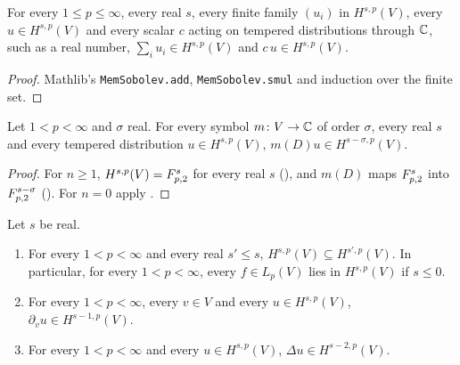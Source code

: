 \begin{lemma}
\label{lem:bessel-potential-closure}
\leanok
For every $1 \leq p \leq \infty$, every real $s$, every finite family $(u_i)$ in $H^{s,p}(V)$,
every $u \in H^{s,p}(V)$ and every scalar $c$ acting on tempered distributions through $\mathbb{C}$, such
as a real number, $\sum_i u_i \in H^{s,p}(V)$ and $c \, u \in H^{s,p}(V)$.
\end{lemma}

\begin{proof}
\leanok
Mathlib's \texttt{MemSobolev.\allowbreak add}, \texttt{MemSobolev.\allowbreak smul} and induction
over the finite set.
\end{proof}

\begin{theorem}
\label{thm:bessel-potential-multiplier}
\leanok
{}
Let $1 < p < \infty$ and $\sigma$ real. For every symbol $m \colon V \to \mathbb{C}$ of order $\sigma$,
every real $s$ and every tempered distribution $u \in H^{s,p}(V)$,
$m(D) u \in H^{s-\sigma,p}(V)$.
\end{theorem}

\begin{proof}
\leanok
For $n \geq 1$, $H^{s,p}(V) = F^{s}_{p,2}$ for every real $s$
(), and $m(D)$ maps $F^{s}_{p,2}$ into
$F^{s-\sigma}_{p,2}$ (). For $n = 0$ apply
.
\end{proof}

\begin{corollary}
\label{cor:bessel-potential-mapping}
\leanok
{}
Let $s$ be real.
\begin{enumerate}
  \item For every $1 < p < \infty$ and every real $s' \leq s$, $H^{s,p}(V) \subseteq H^{s',p}(V)$.
    In particular, for every $1 < p < \infty$, every $f \in L_p(V)$ lies in $H^{s,p}(V)$ if
    $s \leq 0$.
  \item For every $1 < p < \infty$, every $v \in V$ and every $u \in H^{s,p}(V)$,
    $\partial_v u \in H^{s-1,p}(V)$.
  \item For every $1 < p < \infty$ and every $u \in H^{s,p}(V)$, $\Delta u \in H^{s-2,p}(V)$.
\end{enumerate}
\end{corollary}

